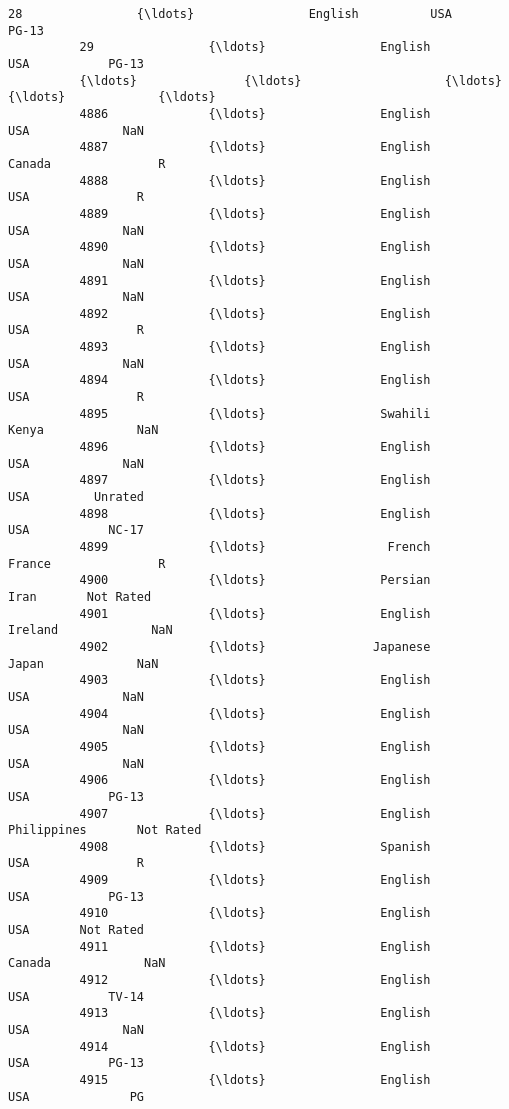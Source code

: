 \documentclass[11pt]{article}
\begin{document}
\begin{Verbatim}[commandchars=\\\{\}]
          28                {\ldots}                English          USA           PG-13   
          29                {\ldots}                English          USA           PG-13   
          {\ldots}               {\ldots}                    {\ldots}          {\ldots}             {\ldots}   
          4886              {\ldots}                English          USA             NaN   
          4887              {\ldots}                English       Canada               R   
          4888              {\ldots}                English          USA               R   
          4889              {\ldots}                English          USA             NaN   
          4890              {\ldots}                English          USA             NaN   
          4891              {\ldots}                English          USA             NaN   
          4892              {\ldots}                English          USA               R   
          4893              {\ldots}                English          USA             NaN   
          4894              {\ldots}                English          USA               R   
          4895              {\ldots}                Swahili        Kenya             NaN   
          4896              {\ldots}                English          USA             NaN   
          4897              {\ldots}                English          USA         Unrated   
          4898              {\ldots}                English          USA           NC-17   
          4899              {\ldots}                 French       France               R   
          4900              {\ldots}                Persian         Iran       Not Rated   
          4901              {\ldots}                English      Ireland             NaN   
          4902              {\ldots}               Japanese        Japan             NaN   
          4903              {\ldots}                English          USA             NaN   
          4904              {\ldots}                English          USA             NaN   
          4905              {\ldots}                English          USA             NaN   
          4906              {\ldots}                English          USA           PG-13   
          4907              {\ldots}                English  Philippines       Not Rated   
          4908              {\ldots}                Spanish          USA               R   
          4909              {\ldots}                English          USA           PG-13   
          4910              {\ldots}                English          USA       Not Rated   
          4911              {\ldots}                English       Canada             NaN   
          4912              {\ldots}                English          USA           TV-14   
          4913              {\ldots}                English          USA             NaN   
          4914              {\ldots}                English          USA           PG-13   
          4915              {\ldots}                English          USA              PG   
          

\end{Verbatim}
\end{document}
